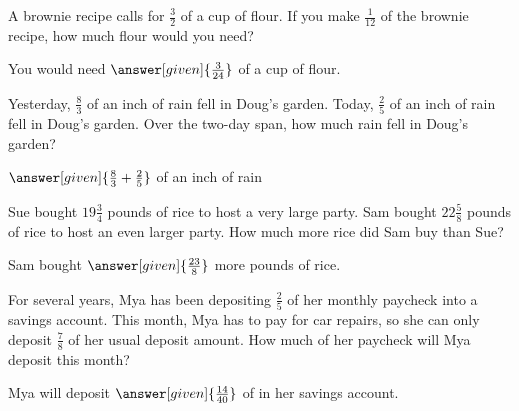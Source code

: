 \documentclass[nooutcomes]{ximera}
\begin{document}
\begin{problem}
A brownie recipe calls for $\frac{3}{2}$ of a cup of flour.  If you make $\frac{1}{12}$ of the brownie recipe, how much flour would you need?

\begin{prompt}
	You would need $\answer[given]{\frac{3}{24}}$ of a cup of flour.
\end{prompt}
\end{problem}




\begin{problem}
	Yesterday, $\frac{8}{3}$ of an inch of rain fell in Doug's garden.  Today, $\frac{2}{5}$ of an inch of rain fell in Doug's garden.  Over the two-day span, how much rain fell in Doug's garden?
	
	\begin{prompt}
		$\answer[given]{\frac{8}{3}+\frac{2}{5}}$ of an inch of rain
	\end{prompt}
\end{problem}





\begin{problem}
Sue bought $19 \frac{3}{4}$ pounds of rice to host a very large party.  Sam bought $22 \frac{5}{8}$ pounds of rice to host an even larger party.  How much more rice did Sam buy than Sue?

\begin{prompt}
	Sam bought $\answer[given]{\frac{23}{8}}$ more pounds of rice.
\end{prompt}

\end{problem}




\begin{problem}

For several years, Mya has been depositing $\frac{2}{5}$ of her monthly paycheck into a savings account.  This month, Mya has to pay for car repairs, so she can only deposit $\frac{7}{8}$ of her usual deposit amount.  How much of her paycheck will Mya deposit this month?

\begin{prompt}
 Mya will deposit $\answer[given]{\frac{14}{40}}$ of  in her savings account.
\end{prompt}



\end{problem}
\end{document}
